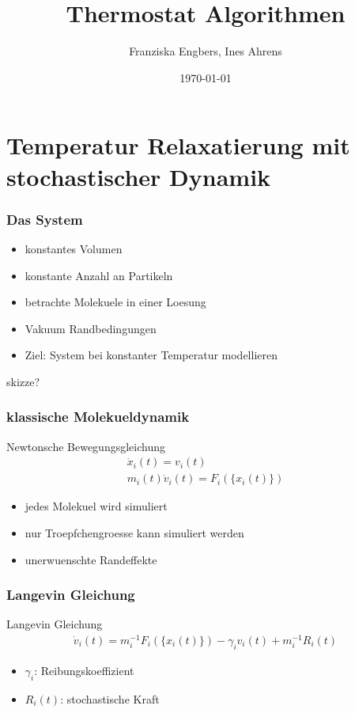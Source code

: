 \documentclass{beamer}
\title{Thermostat Algorithmen}
\author{Franziska Engbers, Ines Ahrens}
\date{\today}
\begin{document}
\maketitle
\frame{\tableofcontents[currentsection]}

\section{Temperatur Relaxatierung mit stochastischer Dynamik}

\begin{frame}
	\frametitle{Das System}
	\begin{itemize}
		\item konstantes Volumen
		\item konstante Anzahl an Partikeln	
		\item betrachte Molekuele in einer Loesung
		\item Vakuum Randbedingungen
		\item Ziel: System bei konstanter Temperatur modellieren		
	\end{itemize}
	skizze?
\end{frame}

\begin{frame} 
  \frametitle{klassische Molekueldynamik}
  \begin{block}{Newtonsche Bewegungsgleichung} 
	\begin{align*}
	\dot{x}_i(t) = v_i(t) \\
	m_i(t) \dot{v}_i(t) = F_i(\{ x_i(t)\}) 
	\end{align*}
  \end{block}
  \begin{itemize}
  	\item jedes Molekuel wird simuliert
  	\item nur Troepfchengroesse kann simuliert werden 
  	\item unerwuenschte Randeffekte
  \end{itemize}
  \end{frame}
  
  \begin{frame}
  \frametitle{Langevin Gleichung}
  \begin{block}{Langevin Gleichung} %
	\begin{align*}
	\dot{v}_i(t)  = m_i^{-1} F_i(\{x_i(t)\}) - \gamma_i v_i(t) + m_i^{-1} R_i(t)
	\end{align*}
  \end{block}  
  \begin{itemize}
  	\item $\gamma_i$: Reibungskoeffizient 
  	\item $R_i(t)$: stochastische Kraft  
  \end{itemize}
  
\end{frame}
\end{document}
